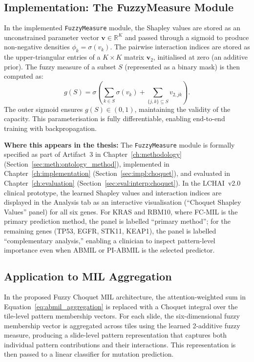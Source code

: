 \subsection{Implementation: The FuzzyMeasure Module}
\label{sec:bg:choquet:implementation}

In the implemented \texttt{FuzzyMeasure} module, the Shapley values are stored as an unconstrained parameter vector $\mathbf{v} \in \mathbb{R}^K$ and passed through a sigmoid to produce non-negative densities $\phi_k = \sigma(v_k)$.
The pairwise interaction indices are stored as the upper-triangular entries of a $K \times K$ matrix $\mathbf{v}_2$, initialised at zero (an additive prior).
The fuzzy measure of a subset $S$ (represented as a binary mask) is then computed as:
\begin{equation}
\label{eq:fuzzy_measure_impl}
g(S) = \sigma\!\left(\sum_{k \in S} \sigma(v_k) + \sum_{\{j,k\} \subseteq S} v_{2,jk}\right).
\end{equation}
The outer sigmoid ensures $g(S) \in (0, 1)$, maintaining the validity of the capacity.
This parameterisation is fully differentiable, enabling end-to-end training with backpropagation.

\textbf{Where this appears in the thesis:}
The \texttt{FuzzyMeasure} module is formally specified as part of
Artifact~3 in Chapter~\ref{ch:methodology}
(Section~\ref{sec:meth:ontology_method}), implemented in
Chapter~\ref{ch:implementation}
(Section~\ref{sec:impl:choquet}), and evaluated in
Chapter~\ref{ch:evaluation}
(Section~\ref{sec:eval:interp:choquet}).
In the LCHAI~v2.0 clinical prototype, the learned Shapley values and
interaction indices are displayed in the Analysis tab as an
interactive visualisation (``Choquet Shapley Values'' panel) for all
six genes.
For KRAS and RBM10, where FC-MIL is the primary prediction method,
the panel is labelled ``primary method''; for the remaining genes
(TP53, EGFR, STK11, KEAP1), the panel is labelled ``complementary
analysis,'' enabling a clinician to inspect pattern-level importance
even when ABMIL or PI-ABMIL is the selected predictor.


\subsection{Application to MIL Aggregation}
\label{sec:bg:choquet:mil}

In the proposed Fuzzy Choquet MIL architecture, the attention-weighted sum in Equation~\ref{eq:abmil_aggregation} is replaced with a Choquet integral over the tile-level pattern membership vectors.
For each slide, the six-dimensional fuzzy membership vector is aggregated across tiles using the learned 2-additive fuzzy measure, producing a slide-level pattern representation that captures both individual pattern contributions and their interactions.
This representation is then passed to a linear classifier for mutation prediction.

